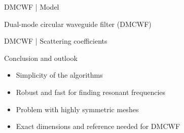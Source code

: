 \documentclass{beamer}
\begin{document}
\begin{frame}{DMCWF | Model}

    Dual-mode circular waveguide filter (DMCWF)

    \begin{figure}
        \centering
    \end{figure}

\end{frame}

\begin{frame}{DMCWF | Scattering coefficients}

    \begin{figure}
        \centering
        \scalebox{0.8}{}
    \end{figure}

\end{frame}

\begin{frame}{Conclusion and outlook}

    \begin{itemize}
        \item<1-> Simplicity of the algorithms
        \item<2-> Robust and fast for finding resonant frequencies
        \item<3-> Problem with highly symmetric meshes
        \item<4-> Exact dimensions and reference needed for DMCWF
    \end{itemize}

\end{frame}
\end{document}

